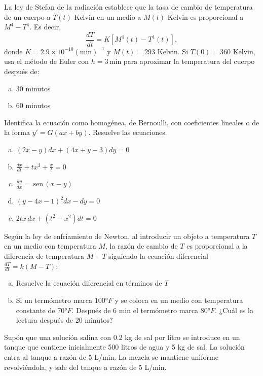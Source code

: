 \documentclass[12pt]{exam}
\renewcommand{\sin}{\,\text{sen}\,}
\begin{document}
\begin{questions}
     
     \question
     La ley de Stefan de la radiación establece que la tasa de cambio de temperatura de un cuerpo a $T(t)$ Kelvin en un medio a $M(t)$ Kelvin es proporcional a $M^4-T^4$. Es decir, $$\frac{dT}{dt}=K\left[M^4(t)-T^4(t) \right],$$ donde $K=2.9\times10^{-10}(\text{min})^{-1}$ y $M(t)=293$ Kelvin. Si $T(0)=360$ Kelvin, usa el método de Euler con $h=3\,\text{min}$ para aproximar la temperatura del cuerpo después de:
     
     \begin{enumerate}[a)]
         \item 30 minutos
         \item 60 minutos
     \end{enumerate}


     \question
     Identifica la ecuación como homogénea, de Bernoulli, con coeficientes lineales o de la forma $y'=G(ax+by)$. Resuelve las ecuaciones.
     \begin{enumerate}[a)]
        \item $(2x-y)dx+(4x+y-3)dy=0$
        \item $\frac{dx}{dt}+tx^3+\frac{x}{t}=0$
        \item $\frac{dy}{dx}= \sin(x-y)$
     	\item $(y-4x-1)^2dx-dy=0$
        \item $2tx\,dx+(t^2-x^2)dt=0$
       \end{enumerate}

     \question
     Según la ley de enfriamiento de Newton, al introducir un objeto a temperatura $T$ en un medio con temperatura $M$, la razón de cambio de $T$ es proporcional a la diferencia de temperatura $M-T$ siguiendo la ecuación diferencial $\frac{dT}{dt}=k(M-T)$:
     \begin{enumerate}[a)]
     \item	Resuelve la ecuación diferencial en términos de $T$
     \item	Si un termómetro marca $100°F$ y se coloca en un medio con temperatura constante de $70°F$.  Después de 6 min el termómetro marca $80°F$. ¿Cuál es la lectura después de 20 minutos?
     \end{enumerate}


     \question
     Supón que una solución salina con 0.2 kg de sal por litro se introduce en un tanque que contiene inicialmente 500 litros de agua y 5 kg de sal. La solución entra al tanque a razón de 5 L/min. La mezcla se mantiene uniforme revolviéndola, y sale del tanque a razón de 5 L/min.


\end{questions}
\end{document}
